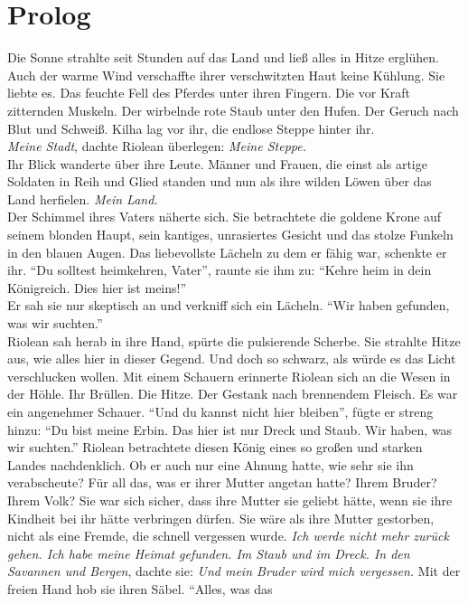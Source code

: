 \chapter{Prolog}

Die Sonne strahlte seit Stunden auf das Land und ließ alles in Hitze erglühen. Auch der warme Wind 
verschaffte ihrer verschwitzten Haut keine Kühlung. Sie liebte es. Das feuchte Fell des Pferdes 
unter ihren Fingern. Die vor Kraft zitternden Muskeln. Der wirbelnde rote Staub unter den Hufen. 
Der Geruch nach Blut und Schweiß. Kilha lag vor ihr, die endlose Steppe hinter ihr.\\
\textit{Meine Stadt}, dachte Riolean überlegen: \textit{Meine Steppe.}\\
Ihr Blick wanderte über ihre Leute. Männer und Frauen, die einst als artige Soldaten in Reih und 
Glied standen und nun als ihre wilden Löwen über das Land herfielen. \textit{Mein Land.}\\
Der Schimmel ihres Vaters näherte sich. Sie betrachtete die goldene Krone auf seinem blonden Haupt, 
sein kantiges, unrasiertes Gesicht und das stolze Funkeln in den blauen Augen. Das liebevollste 
Lächeln zu dem er fähig war, schenkte er ihr. ``Du solltest heimkehren, Vater'', raunte sie ihm zu: 
``Kehre heim in dein Königreich. Dies hier ist meins!''\\
Er sah sie nur skeptisch an und verkniff sich ein Lächeln. ``Wir haben gefunden, was wir 
suchten.''\\
Riolean sah herab in ihre Hand, spürte die pulsierende Scherbe. Sie strahlte Hitze aus, wie alles 
hier in dieser Gegend. Und doch so schwarz, als würde es das Licht verschlucken wollen. Mit einem 
Schauern erinnerte Riolean sich an die Wesen in der Höhle. Ihr Brüllen. Die Hitze. Der Gestank nach 
brennendem Fleisch. Es war ein angenehmer Schauer. ``Und du kannst nicht hier bleiben'', fügte er 
streng hinzu: ``Du bist meine Erbin. Das hier ist nur Dreck und Staub. Wir haben, was wir suchten.''
Riolean betrachtete diesen König eines so großen und starken Landes nachdenklich. Ob er auch nur 
eine Ahnung hatte, wie sehr sie ihn verabscheute? Für all das, was er ihrer Mutter angetan 
hatte? Ihrem Bruder? Ihrem Volk? Sie war sich sicher, dass ihre Mutter sie geliebt hätte, wenn 
sie ihre Kindheit bei ihr hätte verbringen dürfen. Sie wäre als ihre Mutter gestorben, nicht als 
eine Fremde, die schnell vergessen wurde. \textit{Ich werde nicht mehr zurück gehen. Ich habe 
meine Heimat gefunden. Im Staub und im Dreck. In den Savannen und Bergen}, dachte sie: \textit{Und 
mein Bruder wird mich vergessen.} Mit der freien Hand hob sie ihren Säbel. ``Alles, was das 
